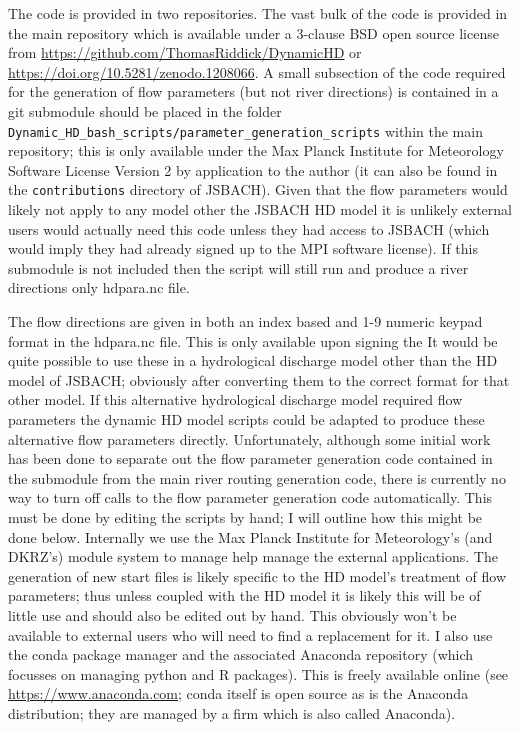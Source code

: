 \documentclass{article}
\begin{document}
The code is provided in two repositories. The vast bulk of the code is provided in the main repository which is available under a 3-clause BSD open source license from \url{https://github.com/ThomasRiddick/DynamicHD} or \url{https://doi.org/10.5281/zenodo.1208066}. A small subsection of the code required for the generation of flow parameters (but not river directions) is contained in a git submodule should be placed in the folder \\\lstinline[style=bash_input]{Dynamic_HD_bash_scripts/parameter_generation_scripts} within the main repository; this is only available under the Max Planck Institute for Meteorology Software License Version 2 by application to the author (it can also be found in the \lstinline[style=bash_input]{contributions} directory of JSBACH). Given that the flow parameters would likely not apply to any model other the JSBACH HD model it is unlikely external users would actually need this code unless they had access to JSBACH (which would imply they had already signed up to the MPI software license). If this submodule is not included then the script will still run and produce a river directions only hdpara.nc file.

The flow directions are given in both an index based and 1-9 numeric keypad format in the hdpara.nc file. This is only available upon signing the  It would be quite possible to use these in a hydrological discharge model other than the HD model of JSBACH; obviously after converting them to the correct format for that other model. If this alternative hydrological discharge model required flow parameters the
dynamic HD model scripts could be adapted to produce these alternative flow parameters directly. Unfortunately, although some initial work has been done to separate out the flow parameter generation code contained in the submodule from the main river routing generation code, there is currently no way to turn off calls to the flow parameter generation code automatically. This must be done by editing the scripts by hand; I will outline how this might be done below. Internally we use the Max Planck Institute for Meteorology's (and DKRZ's) module system to manage help manage the external applications. The generation of new start files is likely specific to the HD model's treatment of flow parameters; thus unless coupled with the HD model it is likely this will be of little use and should also be edited out by hand. This obviously won't be available to external users who will need to find a replacement for it. I also use the conda package manager and the associated Anaconda repository (which focusses on managing python and R packages). This is freely available online (see \url{https://www.anaconda.com}; conda itself is open source as is the Anaconda distribution; they are managed by a firm which is also called Anaconda).
\end{document}
